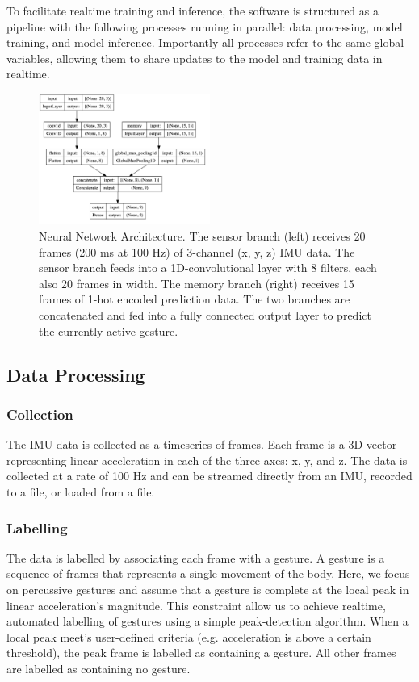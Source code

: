 \documentclass{article}
\begin{document}
To facilitate realtime training and inference, the software is structured as a pipeline with the following processes running in parallel: data processing, model training, and model inference. Importantly all processes refer to the same global variables, allowing them to share updates to the model and training data in realtime.


\begin{figure}[h]
    \includegraphics[width=0.5\textwidth]{../figures/model_diagram.jpg}
    \caption{Neural Network Architecture. The sensor branch (left) receives 20 frames (200 ms at 100 Hz) of 3-channel (x, y, z) IMU data. The sensor branch feeds into a 1D-convolutional layer with 8 filters, each also 20 frames in width. The memory branch (right) receives 15 frames of 1-hot encoded prediction data. The two branches are concatenated and fed into a fully connected output layer to predict the currently active gesture.}
    \label{fig:your_label}
\end{figure}


\subsection{Data Processing}
\subsubsection{Collection}
The IMU data is collected as a timeseries of frames. Each frame is a 3D vector representing linear acceleration in each of the three axes: x, y, and z. The data is collected at a rate of 100 Hz and can be streamed directly from an IMU, recorded to a file, or loaded from a file.

\subsubsection{Labelling}
The data is labelled by associating each frame with a gesture. A gesture is a sequence of frames that represents a single movement of the body. Here, we focus on percussive gestures and assume that a gesture is complete at the local peak in linear acceleration's magnitude. This constraint allow us to achieve realtime, automated labelling of gestures using a simple peak-detection algorithm. When a local peak meet's user-defined criteria (e.g. acceleration is above a certain threshold), the peak frame is labelled as containing a gesture. All other frames are labelled as containing no gesture.
\end{document}
